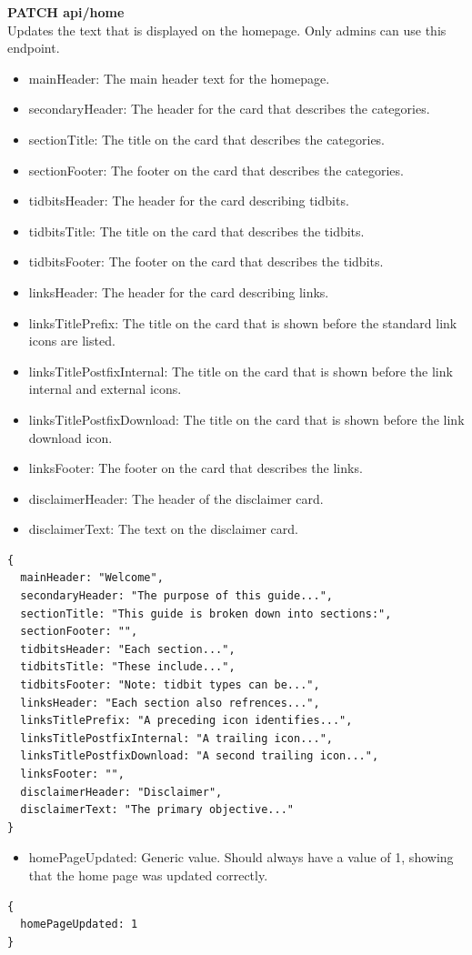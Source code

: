 \documentclass[onecolumn, draftclsnofoot,10pt, compsoc, usenames, dvipsnames]{IEEEtran}
\begin{document}
\noindent
\textbf{\textcolor{BlueGreen}{PATCH} api/home} \\
Updates the text that is displayed on the homepage. Only admins can use this endpoint.
\begin{itemize}
    \item mainHeader: The main header text for the homepage.
    \item secondaryHeader: The header for the card that describes the categories.
    \item sectionTitle: The title on the card that describes the categories.
    \item sectionFooter: The footer on the card that describes the categories.
    \item tidbitsHeader: The header for the card describing tidbits.
    \item tidbitsTitle: The title on the card that describes the tidbits.
    \item tidbitsFooter: The footer on the card that describes the tidbits.
    \item linksHeader: The header for the card describing links.
    \item linksTitlePrefix: The title on the card that is shown before the standard link icons are listed.
    \item linksTitlePostfixInternal: The title on the card that is shown before the link internal and  external icons.
    \item linksTitlePostfixDownload: The title on the card that is shown before the link download icon.
    \item linksFooter: The footer on the card that describes the links.
    \item disclaimerHeader: The header of the disclaimer card.
    \item disclaimerText: The text on the disclaimer card.
\end{itemize}
\begin{lstlisting}[caption=Example Request Body]
{ 
  mainHeader: "Welcome",
  secondaryHeader: "The purpose of this guide...",
  sectionTitle: "This guide is broken down into sections:",
  sectionFooter: "",
  tidbitsHeader: "Each section...",
  tidbitsTitle: "These include...",
  tidbitsFooter: "Note: tidbit types can be...",
  linksHeader: "Each section also refrences...",
  linksTitlePrefix: "A preceding icon identifies...",
  linksTitlePostfixInternal: "A trailing icon...",
  linksTitlePostfixDownload: "A second trailing icon...",
  linksFooter: "",
  disclaimerHeader: "Disclaimer",
  disclaimerText: "The primary objective..."
}
\end{lstlisting}
\begin{itemize}
    \item homePageUpdated: Generic value. Should always have a value of 1, showing that the home page was updated correctly.
\end{itemize}
\begin{lstlisting}[caption=Example Response]
{
  homePageUpdated: 1
}
\end{lstlisting}
\\~\\
\end{document}
